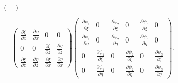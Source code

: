 \documentclass{report}
\begin{document}
\begin{align*}
\begin{pmatrix}
		\end{pmatrix}\\\\
		=  \begin{pmatrix}
			\frac{\partial \xi}{\partial x} & \frac{\partial \eta}{\partial x} & 0 & 0\\
			0 & 0 & 	\frac{\partial \xi}{\partial z} & \frac{\partial \eta}{\partial z}\\
			\frac{\partial \xi}{\partial z} & \frac{\partial \eta}{\partial z} & \frac{\partial \xi}{\partial x} & \frac{\partial \eta}{\partial x}
		\end{pmatrix}
		\begin{pmatrix}
			\frac{\partial \psi_1}{\partial \xi} & 0 &\frac{\partial \psi_2}{\partial \xi} & 0 & \frac{\partial \psi_3}{\partial \xi} & 0\\
			\frac{\partial \psi_1}{\partial \eta} & 0 &\frac{\partial \psi_2}{\partial \eta} & 0 & \frac{\partial \psi_3}{\partial \eta} & 0\\
			0 & \frac{\partial \psi_1}{\partial \xi} & 0 &\frac{\partial \psi_2}{\partial \xi} & 0 &\frac{\partial \psi_3}{\partial \xi}\\
			0 & \frac{\partial \psi_1}{\partial \eta} & 0 &\frac{\partial \psi_2}{\partial \eta} & 0 &\frac{\partial \psi_3}{\partial \eta}
		\end{pmatrix}.
	\end{align*}
	
\end{document}

